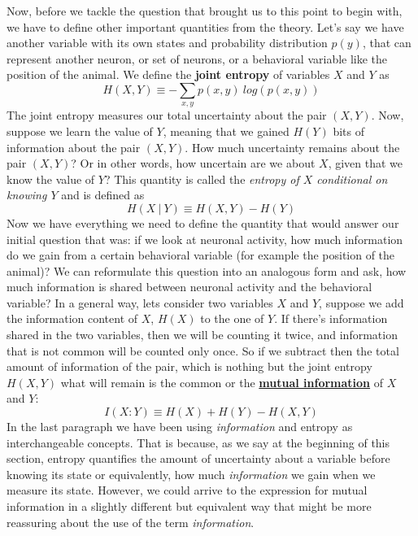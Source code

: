 Now, before we tackle the question that brought us to this point to begin with, we have to define other important quantities from the theory.
Let's say we have another variable with its own states and probability distribution ${p(y)}$, that can represent another neuron, or set of neurons, or a behavioral variable like the position of the animal. 
We define the \textbf{joint entropy} of variables $X$ and $Y$ as
\begin{equation}
    H(X,Y)\equiv-\sum_{x,y}p(x,y)\ log(p(x,y)) 
\end{equation}
The joint entropy measures our total uncertainty about the pair $(X,Y)$.
Now, suppose we learn the value of $Y$, meaning that we gained $H(Y)$ bits of information about the pair $(X,Y)$.
How much uncertainty remains about the pair $(X,Y)$? 
Or in other words, how uncertain are we about $X$, given that we know the value of $Y$?
This quantity is called the \textit{entropy of $X$ conditional on knowing $Y$} and is defined as
\begin{equation}
\label{eqn:condentropy}
    H(X\ |\ Y) \equiv H(X,Y)-H(Y)
\end{equation}
Now we have everything we need to define the quantity that would answer our initial question that was: if we look at neuronal activity, how much information do we gain from a certain behavioral variable (for example the position of the animal)? 
We can reformulate this question into an analogous form and ask, how much information is shared between neuronal activity and the behavioral variable?
In a general way, lets consider two variables $X$ and $Y$, suppose we add the information content of $X$, $H(X)$ to the one of $Y$.
If there's information shared in the two variables, then we will be counting it twice, and information that is not common will be counted only once. 
So if we subtract then the total amount of information of the pair, which is nothing but the joint entropy $H(X,Y)$ what will remain is the common or the \underline{\textbf{mutual information}} of $X$ and $Y$:
\begin{equation}
\label{eqn:mutualinfo1}
    I(X:Y)\equiv H(X)+H(Y)-H(X,Y)
\end{equation}
In the last paragraph we have been using \textit{information} and entropy as interchangeable concepts.
That is because, as we say at the beginning of this section, entropy quantifies the amount of uncertainty about a variable before knowing its state or equivalently, how much \textit{information} we gain when we measure its state.
However, we could arrive to the expression for mutual information in a slightly different but equivalent way that might be more reassuring about the use of the term \textit{information}.
